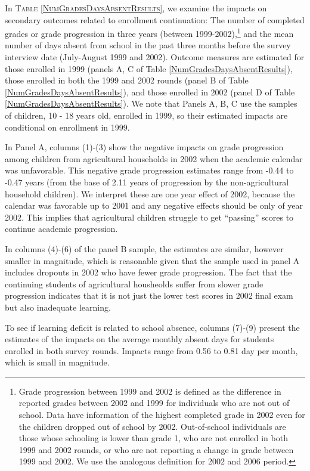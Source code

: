 \documentclass[12pt,letterpaper]{article}\usepackage[margin=1in]{geometry}
\newcommand{\0}{\ensuremath{\mbox{\boldmath $0$}}}
\begin{document}
In \textsc{\small Table \ref{NumGradesDaysAbsentResults}}, we examine the impacts on secondary outcomes related to enrollment continuation: The number of completed grades or grade progression in three years (between 1999-2002),\footnote{Grade progression between 1999 and 2002 is defined as the difference in reported grades between 2002 and 1999 for individuals who are not out of school. Data have information of the highest completed grade in 2002 even for the children dropped out of school by 2002. Out-of-school individuals are those whose schooling is lower than grade 1, who are not enrolled in both 1999 and 2002 rounds, or who are not reporting a change in grade between 1999 and 2002. We use the analogous definition for 2002 and 2006 period. } and the mean number of days absent from school in the past three months before the survey interview date (July-August 1999 and 2002). Outcome measures are estimated for those enrolled in 1999 (panels A, C of Table \ref{NumGradesDaysAbsentResults}), those enrolled in both the 1999 and 2002 rounds (panel B of Table \ref{NumGradesDaysAbsentResults}), and those enrolled in 2002 (panel D of Table \ref{NumGradesDaysAbsentResults}). We note that Panels A, B, C use the samples of children, 10 - 18 years old, enrolled in 1999, so their estimated impacts are conditional on enrollment in 1999.

In Panel A, columns (1)-(3) show the negative impacts on grade progression among children from agricultural households in 2002 when the academic calendar was unfavorable. This negative grade progression estimates range from -0.44 to -0.47 years (from the base of 2.11 years of progression by the non-agricultural household children). We interpret these are one year effect of 2002, because the calendar was favorable up to 2001 and any negative effects should be only of year 2002. This implies that agricultural children struggle to get ``passing'' scores to continue academic progression. 

In columns (4)-(6) of the panel B sample, the estimates are similar, however smaller in magnitude, which is reasonable given that the sample used in panel A includes dropouts in 2002 who have fewer grade progression. The fact that the continuing students of agricultural housheolds suffer from slower grade progression indicates that  it is not just the lower test scores in 2002 final exam but also inadequate learning. 

To see if learning deficit is related to school absence, columns (7)-(9) present the estimates of the impacts on the average monthly absent days for students enrolled in both survey rounds. Impacts range from 0.56 to 0.81 day per month, which is small in magnitude. 
\end{document}
